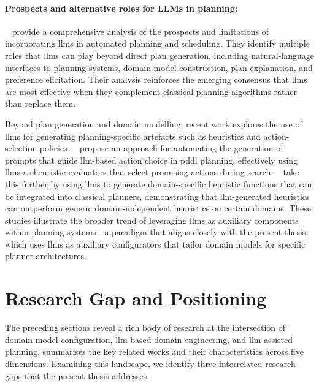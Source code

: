 \paragraph{Prospects and alternative roles for LLMs in planning:}
\citeauthor{Pallagani2024}~\cite{Pallagani2024} provide a comprehensive analysis of the prospects and limitations of incorporating \glspl{llm} in automated planning and scheduling.
They identify multiple roles that \glspl{llm} can play beyond direct plan generation, including natural-language interfaces to planning systems, domain model construction, plan explanation, and preference elicitation.
Their analysis reinforces the emerging consensus that \glspl{llm} are most effective when they complement classical planning algorithms rather than replace them.

Beyond plan generation and domain modelling, recent work explores the use of \glspl{llm} for generating planning-specific artefacts such as heuristics and action-selection policies.
\citeauthor{Stein2025}~\cite{Stein2025} propose an approach for automating the generation of prompts that guide \gls{llm}-based action choice in \gls{pddl} planning, effectively using \glspl{llm} as heuristic evaluators that select promising actions during search.
\citeauthor{Tuisov2025}~\cite{Tuisov2025} take this further by using \glspl{llm} to generate domain-specific heuristic functions that can be integrated into classical planners, demonstrating that \gls{llm}-generated heuristics can outperform generic domain-independent heuristics on certain domains.
These studies illustrate the broader trend of leveraging \glspl{llm} as auxiliary components within planning systems---a paradigm that aligns closely with the present thesis, which uses \glspl{llm} as auxiliary configurators that tailor domain models for specific planner architectures.

\section{Research Gap and Positioning}
\label{sec:rw:gap}

The preceding sections reveal a rich body of research at the intersection of domain model configuration, \gls{llm}-based domain engineering, and \gls{llm}-assisted planning.
 summarises the key related works and their characteristics across five dimensions.
Examining this landscape, we identify three interrelated research gaps that the present thesis addresses.

